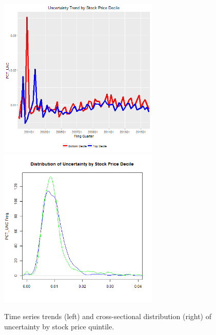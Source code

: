 \begin{figure}[H] 
\centering
\includegraphics[width=3in, height=3in]{figures/punc-by-price-ts}
\includegraphics[width=3in, height=3in]{figures/punc-by-price-xs}
\captionsetup{justification=centering, width=.95\textwidth} 
\caption{\footnotesize Time series trends (left) and cross-sectional distribution (right) of uncertainty by stock price quintile.} \label{bunc-price}
\end{figure} 
